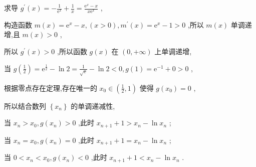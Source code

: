\documentclass[10pt]{article}
\begin{document}
求导 \({g}^{\prime }\left( x\right)  =  - \frac{1}{{\mathrm{e}}^{x}} + \frac{1}{x} = \frac{{\mathrm{e}}^{x} - x}{x{\mathrm{e}}^{x}}\) ,

构造函数 \(m\left( x\right)  = {\mathrm{e}}^{x} - x,\left( {x > 0}\right) ,{m}^{\prime }\left( x\right)  = {\mathrm{e}}^{x} - 1 > 0\) ,所以 \(m\left( x\right)\) 单调递增,且 \(m\left( x\right)  > 0\) ,

所以 \({g}^{\prime }\left( x\right)  > 0\) ,所以函数 \(g\left( x\right)\) 在 \(\left( {0, + \infty }\right)\) 上单调递增,

当 \(g\left( \frac{1}{2}\right)  = {\mathrm{e}}^{\frac{1}{2}} - \ln 2 = \frac{1}{\sqrt{\mathrm{e}}} - \ln 2 < 0,g\left( 1\right)  = {\mathrm{e}}^{-1} + 0 > 0\) ,

根据零点存在定理,存在唯一的 \({x}_{0} \in  \left( {\frac{1}{2},1}\right)\) 使得 \(g\left( {x}_{0}\right)  = 0\) ,

所以结合数列 \(\left\{  {x}_{n}\right\}\) 的单调递减性,

当 \({x}_{n} > {x}_{0},g\left( {x}_{n}\right)  > 0\) ,此时 \({x}_{n + 1} + 1 > {x}_{n} - \ln {x}_{n}\) ;

当 \({x}_{n} = {x}_{0},g\left( {x}_{n}\right)  = 0\) ,此时 \({x}_{n + 1} + 1 = {x}_{n} - \ln {x}_{n}\) ;

当 \(0 < {x}_{n} < {x}_{0},g\left( {x}_{n}\right)  < 0\) ,此时 \({x}_{n + 1} + 1 < {x}_{n} - \ln {x}_{n}\) .
\end{document}
